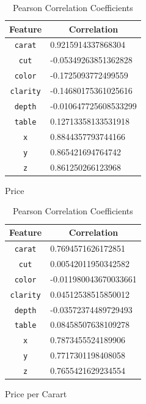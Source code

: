 \documentclass[11pt,letterpaper]{article}
\begin{document}
\begin{table}[H]
    \begin{subtable}[H]{0.45\textwidth}
        \centering
        \begin{tabular}{c l}
            \hline
            Feature & \multicolumn{1}{c}{Correlation}         \\
            \hline 
        \texttt{carat}   & 0.9215914337868304    \\
        \texttt{cut}     & -0.05349263851362828  \\
        \texttt{color}   & -0.1725093772499559   \\
        \texttt{clarity} & -0.14680175361025616  \\
        \texttt{depth}   & -0.010647725608533299 \\
        \texttt{table}   & 0.12713358133531918   \\
        \texttt{x}       & 0.8844357793744166    \\
        \texttt{y}       & 0.865421694764742     \\
        \texttt{z}       & 0.861250266123968    
        \end{tabular}
        \caption{Price}
        \end{subtable}
        \begin{subtable}[H]{0.45\textwidth}
            \centering
            \begin{tabular}{c l}
                \hline
                Feature & \multicolumn{1}{c}{Correlation}         \\
                \hline 
            \texttt{carat}   & 0.7694571626172851    \\
            \texttt{cut}     & 0.00542011950342582   \\
            \texttt{color}   & -0.011980043670033661 \\
            \texttt{clarity} & 0.04512538515850012   \\
            \texttt{depth}   & -0.03572374489729493  \\
            \texttt{table}   & 0.08458507638109278   \\
            \texttt{x}       & 0.7873455524189906    \\
            \texttt{y}       & 0.7717301198408058    \\
            \texttt{z}       & 0.7655421629234554   
            \end{tabular}
            \caption{Price per Carart}
        \end{subtable}
        \caption{Pearson Correlation Coefficients}
    \end{table}
\end{document}
